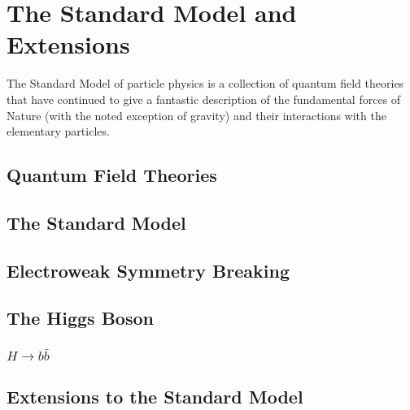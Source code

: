 \chapter{The Standard Model and Extensions}\label{chapter:theory}

The Standard Model of particle physics is a collection of quantum field theories that have continued to give a fantastic description of the fundamental forces of Nature (with the noted exception of gravity) and their interactions with the elementary particles.

\section{Quantum Field Theories}\label{section:QFT}

\section{The Standard Model}\label{section:standard_model}

\section{Electroweak Symmetry Breaking}\label{section:EWSB}

\section{The Higgs Boson}\label{section:Higgs_boson}

\subsection{$H\to b\bar{b}$}\label{section:Hbb}

\section{Extensions to the Standard Model}
